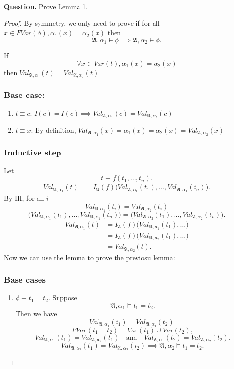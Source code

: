 \documentclass{article}
\newtheorem{lemma}[theorem]{Lemma}
\let\oldlemma\lemma
\let\endoldlemma\endlemma
\renewenvironment{lemma}
  {\begin{tcolorbox}[
      colback=green!8,
      colframe=green!50!black,
      boxrule=0.6pt,
      arc=2pt,
      left=6pt,right=6pt,top=4pt,bottom=4pt
    ]\oldlemma}
  {\endoldlemma\end{tcolorbox}}
\begin{document}
\textbf{Question.} Prove Lemma 1.
\begin{proof}
    By symmetry, we only need to prove if for all $x\in FVar(\phi), \alpha_1(x) = \alpha_2(x)$
    then
    \[
\mathfrak{A},\alpha_1 \models \phi \implies \mathfrak{A},\alpha_2 \models \phi.
\]
\begin{lemma} If
    \[\forall x \in Var(t), \alpha_1(x) = \alpha_2(x)\]
    then $Val_{\mathfrak{A}, \alpha_1}(t) = Val_{\mathfrak{A}, \alpha_2}(t)$
\end{lemma}
\subsubsection*{Base case: }
\begin{enumerate}
    \item $t \equiv c$: $I(c) = I(c) \implies Val_{\mathfrak{A}, \alpha_1}(c) = Val_{\mathfrak{A}, \alpha_2}(c)$
    \item $t \equiv x$: By definition, $Val_{\mathfrak{A}, \alpha_1}(x) = \alpha_1(x) = \alpha_2(x) = Val_{\mathfrak{A}, \alpha_2}(x)$
\end{enumerate}
\subsubsection*{Inductive step}
Let
\[
t \equiv f(t_1,\dots,t_n).
\]
\begin{align*}
Val_{\mathfrak{A},\alpha_1}(t)
&= I_{\mathfrak{A}}(f)\bigl(Val_{\mathfrak{A},\alpha_1}(t_1),\dots,Val_{\mathfrak{A},\alpha_1}(t_n)\bigr).
\end{align*}
By IH, for all $i$
\[
Val_{\mathfrak{A},\alpha_1}(t_i)=Val_{\mathfrak{A},\alpha_2}(t_i)
\]
\[
\bigl(Val_{\mathfrak{A},\alpha_1}(t_1),\dots,Val_{\mathfrak{A},\alpha_1}(t_n)\bigr)
=
\bigl(Val_{\mathfrak{A},\alpha_2}(t_1),\dots,Val_{\mathfrak{A},\alpha_2}(t_n)\bigr).
\]
\begin{align*}
Val_{\mathfrak{A},\alpha_1}(t)
&= I_{\mathfrak{A}}(f)\bigl(Val_{\mathfrak{A},\alpha_1}(t_1),\dots\bigr) \\
&= I_{\mathfrak{A}}(f)\bigl(Val_{\mathfrak{A},\alpha_2}(t_1),\dots\bigr) \\
&= Val_{\mathfrak{A},\alpha_2}(t).
\end{align*}
Now we can use the lemma to prove the previosu lemma: 
\subsubsection*{Base cases}

\begin{enumerate}
    \item $\phi \equiv t_1 = t_2$.
    Suppose
    \[
    \mathfrak{A},\alpha_1 \models t_1=t_2.
    \]
    Then we have
    \[
    Val_{\mathfrak{A},\alpha_1}(t_1)=Val_{\mathfrak{A},\alpha_1}(t_2).
    \]
    \[
    FVar(t_1=t_2)=Var(t_1)\cup Var(t_2),
    \]
    \[
    Val_{\mathfrak{A},\alpha_1}(t_1)=Val_{\mathfrak{A},\alpha_2}(t_1)
    \quad\text{and}\quad
    Val_{\mathfrak{A},\alpha_1}(t_2)=Val_{\mathfrak{A},\alpha_2}(t_2).
    \]
    \[
    Val_{\mathfrak{A},\alpha_2}(t_1)=Val_{\mathfrak{A},\alpha_2}(t_2) \implies 
    \mathfrak{A},\alpha_2 \models t_1=t_2.
    \]


\end{enumerate}
\end{proof}
\end{document}
